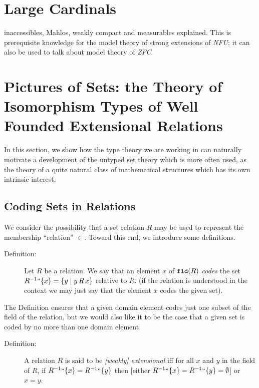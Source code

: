 \documentclass[12pt]{book}
\begin{document}
\section{Large Cardinals}

inaccessibles, Mahlos, weakly compact and measurables explained.  This
is prerequisite knowledge for the model theory of strong extensions of
{\em NFU\/}; it can also be used to talk about model theory of {\em
ZFC\/}.

\newpage

\section
{Pictures of Sets:  the Theory of Isomorphism Types of Well Founded Extensional
Relations}

In this section, we show how the type theory we are working in can
naturally motivate a development of the untyped set theory which is
more often used, as the theory of a quite natural class of
mathematical structures which has its own intrinsic interest.

\subsection{Coding Sets in Relations}

We consider the possibility that a set relation $R$ may be used to
represent the membership ``relation'' $\in$.  Toward this end, we
introduce some definitions.

\begin{description}

\item[Definition:] Let $R$ be a relation.  We say that an element $x$
of ${\tt fld}(R)$ {\em codes\/} the set $R^{-1}``\{x\} = \{y \mid y \,
R \, x\}$ relative to $R$.  (if the relation is understood in the
context we may just say that the element $x$ codes the given set).

\end{description}

The Definition ensures that a given domain element codes just one
subset of the field of the relation, but we would also like it to be
the case that a given set is coded by no more than one domain element.

\begin{description}

\item[Definition:] A relation $R$ is said to be {\em [weakly]
extensional\/} iff for all $x$ and $y$ in the field of $R$, if
$R^{-1}``\{x\} = R^{-1}``\{y\}$ then [either $R^{-1}``\{x\} =
R^{-1}``\{y\} = \emptyset$] or $x=y$.

\end{description}
\end{document}
